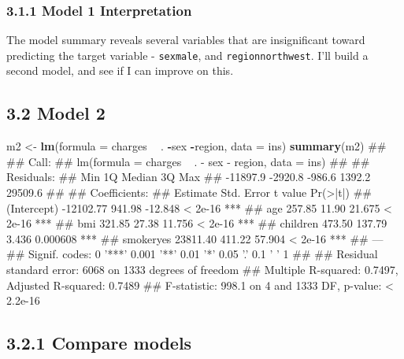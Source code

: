 \documentclass[]{article}
\newenvironment{Shaded}{\begin{snugshade}}{\end{snugshade}}
\newcommand{\KeywordTok}[1]{\textcolor[rgb]{0.13,0.29,0.53}{\textbf{#1}}}
\newcommand{\DataTypeTok}[1]{\textcolor[rgb]{0.13,0.29,0.53}{#1}}
\newcommand{\StringTok}[1]{\textcolor[rgb]{0.31,0.60,0.02}{#1}}
\newcommand{\OperatorTok}[1]{\textcolor[rgb]{0.81,0.36,0.00}{\textbf{#1}}}
\newcommand{\NormalTok}[1]{#1}
\begin{document}
\subsubsection{3.1.1 Model 1
Interpretation}\label{model-1-interpretation}

The model summary reveals several variables that are insignificant
toward predicting the target variable - \texttt{sexmale}, and
\texttt{regionnorthwest}. I'll build a second model, and see if I can
improve on this.

\subsection{3.2 Model 2}\label{model-2}

\begin{Shaded}
\begin{Highlighting}[]
\NormalTok{m2 <-}\StringTok{ }\KeywordTok{lm}\NormalTok{(}\DataTypeTok{formula =}\NormalTok{ charges }\OperatorTok{~}\StringTok{ }\NormalTok{. }\OperatorTok{-}\NormalTok{sex }\OperatorTok{-}\NormalTok{region,}
         \DataTypeTok{data =}\NormalTok{ ins)}
\KeywordTok{summary}\NormalTok{(m2)}
\NormalTok{## }
\NormalTok{## Call:}
\NormalTok{## lm(formula = charges ~ . - sex - region, data = ins)}
\NormalTok{## }
\NormalTok{## Residuals:}
\NormalTok{##      Min       1Q   Median       3Q      Max }
\NormalTok{## -11897.9  -2920.8   -986.6   1392.2  29509.6 }
\NormalTok{## }
\NormalTok{## Coefficients:}
\NormalTok{##              Estimate Std. Error t value Pr(>|t|)    }
\NormalTok{## (Intercept) -12102.77     941.98 -12.848  < 2e-16 ***}
\NormalTok{## age            257.85      11.90  21.675  < 2e-16 ***}
\NormalTok{## bmi            321.85      27.38  11.756  < 2e-16 ***}
\NormalTok{## children       473.50     137.79   3.436 0.000608 ***}
\NormalTok{## smokeryes    23811.40     411.22  57.904  < 2e-16 ***}
\NormalTok{## ---}
\NormalTok{## Signif. codes:  0 '***' 0.001 '**' 0.01 '*' 0.05 '.' 0.1 ' ' 1}
\NormalTok{## }
\NormalTok{## Residual standard error: 6068 on 1333 degrees of freedom}
\NormalTok{## Multiple R-squared:  0.7497, Adjusted R-squared:  0.7489 }
\NormalTok{## F-statistic: 998.1 on 4 and 1333 DF,  p-value: < 2.2e-16}
\end{Highlighting}
\end{Shaded}

\subsection{3.2.1 Compare models}\label{compare-models}
\end{document}
